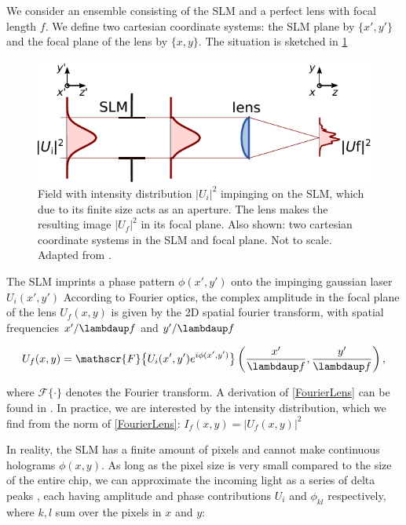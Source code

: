 We consider an ensemble consisting of the SLM and a perfect lens with focal length $f$. We define two cartesian coordinate systems: the SLM plane by $\{x',y'\}$ and the focal plane of the lens by $\{x,y\}$. The situation is sketched in \cref{fig:SLMLens}

\begin{figure}
    \centering
    \includegraphics[width = 12cm]{figures/SLMfigure.pdf}
    \caption{Field with intensity distribution $|U_i|^2$ impinging on the SLM, which due to its finite size acts as an aperture. The lens makes the resulting image $|U_f|^2$ in its focal plane. Also shown: two cartesian coordinate systems in the SLM and focal plane. Not to scale. Adapted from \cite{Labuhn2016}.}
    \label{fig:SLMLens}
\end{figure}

The SLM imprints a phase pattern $\phi(x',y')$ onto the impinging gaussian laser $U_i(x',y')$ According to Fourier optics, the complex amplitude in the focal plane of the lens $U_f(x,y)$ is given by the 2D spatial fourier transform, with spatial frequencies $x'/\lambdaup f$ and $y'/\lambdaup f$ \cite{Bijnen2015}

\begin{equation}\label{FourierLens}
    U_f(x,y) = \mathscr{F} \big\{ U_i(x', y')e^{i \phi(x',y')} \big\} \left(\frac{x'}{\lambdaup f},\frac{y'}{\lambdaup f}\right),
\end{equation}

where $\mathscr{F}\{\cdot\}$ denotes the Fourier transform. A derivation of \cref{FourierLens} can be found in \cite{Dijk2012,Bijnen2013}. In practice, we are interested by the intensity distribution, which we find from the norm of \cref{FourierLens}: $I_f(x,y) = \left|U_f(x,y)\right|^2$

In reality, the SLM has a finite amount of pixels and cannot make continuous holograms $\phi(x,y)$. As long as the pixel size is very small compared to the size of the entire chip, we can approximate the incoming light as a series of delta peaks \cite{Bijnen2013,Labuhn2016}, each having amplitude and phase contributions $U_i$ and $\phi_{kl}$ respectively, where $k,l$ sum over the pixels in $x$ and $y$:

